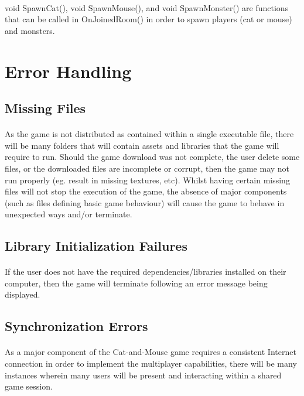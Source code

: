 \documentclass[12pt, titlepage]{article}
\begin{document}
\paragraph{} void SpawnCat(), void SpawnMouse(), and void SpawnMonster() are functions that can be called in OnJoinedRoom() in order to spawn players (cat or mouse) and monsters.
\section{Error Handling} 
\subsection{Missing Files}
\paragraph{}As the game is not distributed as contained within a single executable file, there will be many folders that will contain assets and libraries that the game will require to run. Should the game download was not complete, the user delete some files, or the downloaded files are incomplete or corrupt, then the game may not run properly (eg. result in missing textures, etc). Whilst having certain missing files will not stop the execution of the game, the absence of major components (such as files defining basic game behaviour) will cause the game to behave in unexpected ways and/or terminate.
\subsection{Library Initialization Failures}
\paragraph{}If the user does not have the required dependencies/libraries installed on their computer, then the game will terminate following an error message being displayed.
\subsection{Synchronization Errors}
\paragraph{}As a major component of the Cat-and-Mouse game requires a consistent Internet connection in order to implement the multiplayer capabilities, there will be many instances wherein many users will be present and interacting within a shared game session.
\end{document}
